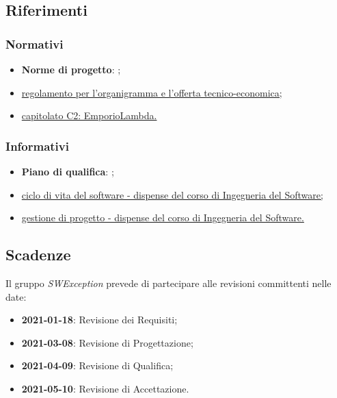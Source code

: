 \subsection{Riferimenti}

\subsubsection{Normativi}
\begin{itemize}
    \item \textbf{Norme di progetto}: ;
    \item \href{https://www.math.unipd.it/~tullio/IS-1/2020/Progetto/RO.html}{regolamento per l'organigramma e l'offerta tecnico-economica;}
    \item \href{https://www.math.unipd.it/~tullio/IS-1/2020/Progetto/C2.pdf}{capitolato C2: EmporioLambda.}
\end{itemize}

\subsubsection{Informativi}
\begin{itemize}
    \item \textbf{Piano di qualifica}: ;
    \item \href{https://www.math.unipd.it/~tullio/IS-1/2020/Dispense/L05.pdf}{ciclo di vita del software - dispense del corso di Ingegneria del Software;}
    \item \href{https://www.math.unipd.it/~tullio/IS-1/2020/Dispense/L05.pdf}{gestione di progetto - dispense del corso di Ingegneria del Software.}
\end{itemize}

\subsection{Scadenze}
Il gruppo \textit{SWException} prevede di partecipare alle revisioni committenti nelle date:
\begin{itemize}
    \item \textbf{2021-01-18}: Revisione dei Requisiti;
    \item \textbf{2021-03-08}: Revisione di Progettazione;
    \item \textbf{2021-04-09}: Revisione di Qualifica;
    \item \textbf{2021-05-10}: Revisione di Accettazione.
\end{itemize}
